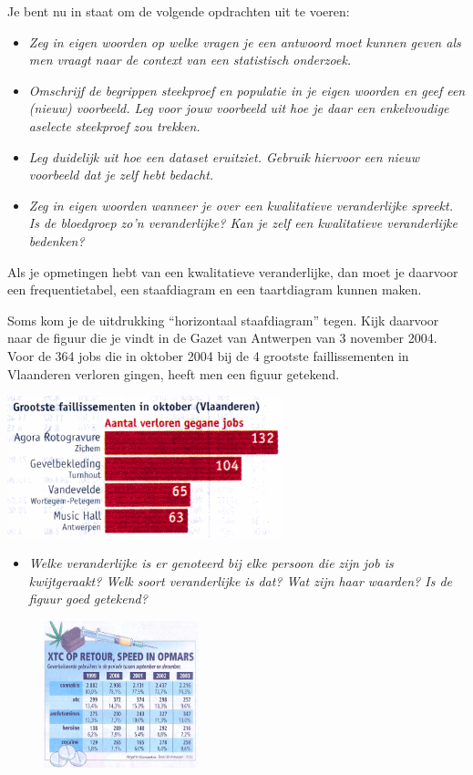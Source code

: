 \documentclass[11pt]{article}
\newcommand{\vraag}[2]{\begin{itemize}\item {\it #1} \vspace*{#2}\end{itemize}}
\begin{document}
Je bent nu in staat om de volgende opdrachten uit te voeren:

\vraag{Zeg in eigen woorden op welke vragen je een antwoord moet kunnen geven als men vraagt
naar de context van een statistisch onderzoek.}{3cm}

\vraag{Omschrijf de begrippen steekproef en populatie in je eigen woorden en geef een (nieuw)
voorbeeld. Leg voor jouw voorbeeld uit hoe je daar een enkelvoudige aselecte steekproef zou
trekken.}{3cm}

\vraag{Leg duidelijk uit hoe een dataset eruitziet. Gebruik hiervoor een nieuw voorbeeld dat je zelf
hebt bedacht.}{3cm}

\vraag{Zeg in eigen woorden wanneer je over een kwalitatieve veranderlijke spreekt. Is de bloedgroep zo’n veranderlijke? Kan je zelf een kwalitatieve veranderlijke bedenken?}{3cm}

Als je opmetingen hebt van een kwalitatieve veranderlijke, dan moet je daarvoor
een frequentietabel, een staafdiagram en een taartdiagram kunnen maken.

Soms kom je de uitdrukking “horizontaal staafdiagram” tegen. Kijk daarvoor naar de figuur
die je vindt in de Gazet van Antwerpen van 3 november 2004. Voor de 364 jobs die in
oktober 2004 bij de 4 grootste faillissementen in Vlaanderen verloren gingen, heeft men een
figuur getekend.

\begin{center}
  \includegraphics[width=0.6\textwidth]{horizontaal_staafdiagram-faillissementen}
\end{center}

\vraag{Welke veranderlijke is er genoteerd bij elke persoon die zijn job is
kwijtgeraakt? Welk soort veranderlijke is dat? Wat zijn haar waarden? Is de figuur goed
getekend?}{4cm}

\newpage

\begin{figure}
  \includegraphics[width=0.4\textwidth]{tabel-drugs}
\end{figure}
\end{document}
